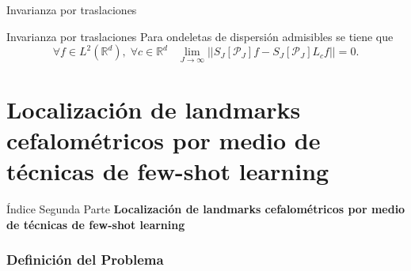 \documentclass[aspectratio=43]{beamer}
\renewcommand{\cite}[1]{\footnote<.->[frame]{\fullcite{#1}}}
\begin{document}
\begin{frame}{Invarianza por traslaciones}
  \begin{alertblock}{Invarianza por traslaciones}
    Para ondeletas de dispersión admisibles se tiene que 
    $$\forall f \in L^2(\mathbb{R}^d), \; \forall c\in \mathbb{R}^d \;\;\; \lim_{J\rightarrow \infty}||S_J[\mathcal{P}_J] f-S_J[\mathcal{P}_J] L_cf||=0.$$
  \end{alertblock}
\end{frame}

\part{Localización de landmarks cefalométricos por medio de técnicas de few-shot learning}

\begin{frame}{Índice Segunda Parte}
  \textcolor{tudCyan}{\textbf{Localización de landmarks cefalométricos por medio de técnicas de few-shot learning}}
  \medskip
  \tableofcontents[part=2]
\end{frame}


\section{Definición del Problema}

\end{document}
